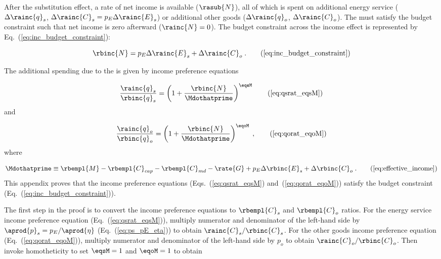

After the substitution effect, 
a rate of net income is available ($\rasub{N}$), 
all of which is spent on
additional energy service ($\Delta \rainc{q}_s$, $\Delta \rainc{C}_s = p_E \Delta \rainc{E}_s$) or 
additional other goods ($\Delta \rainc{q}_o$, $\Delta \rainc{C}_o$).
The \inceffect{} must satisfy the budget constraint
such that net income is zero afterward ($\rainc{N} = 0$).
The budget constraint across the income effect 
is represented by Eq.~(\ref{eq:inc_budget_constraint}): 

\begin{equation}
  \rbinc{N} = p_E \Delta \rainc{E}_s + \Delta \rainc{C}_o \; . \tag{\ref{eq:inc_budget_constraint}}
\end{equation}

The additional spending due to the \inceffect{} is given by income preference equations

\begin{equation}
  \frac{\rainc{q}_s}{\rbinc{q}_s} = \left( 1 + \frac{\rbinc{N}}{\Mdothatprime}  \right) ^{\eqsM} 
                                                                \tag{\ref{eq:qsrat_eqsM}}
\end{equation}
%
and

\begin{equation}
  \frac{\rainc{q}_o}{\rbinc{q}_o} = \left( 1 + \frac{\rbinc{N}}{\Mdothatprime}  \right) ^{\eqoM} \; ,
                                                                \tag{\ref{eq:qorat_eqoM}}
\end{equation}
%
where

\begin{equation}
  \Mdothatprime \equiv \rbempl{M} - \rbempl{C}_{cap} - \rbempl{C}_{md} 
                       - \rate{G} + p_E \Delta \rbinc{E}_s + \Delta \rbinc{C}_o \; .
                                                                \tag{\ref{eq:effective_income}}
\end{equation}
%
This appendix proves that the income preference equations 
(Eqs.~(\ref{eq:qsrat_eqsM}) and~(\ref{eq:qorat_eqoM}))
satisfy the budget constraint (Eq.~(\ref{eq:inc_budget_constraint})).

The first step in the proof is to convert 
the income preference equations
to $\rbempl{C}_s$ and $\rbempl{C}_o$ ratios.
For the energy service income preference equation (Eq.~(\ref{eq:qsrat_eqsM})), 
multiply numerator and denominator of the left-hand side by $\aprod{p}_s = p_E / \aprod{\eta}$
(Eq.~(\ref{eq:ps_pE_eta}))
to obtain $\rainc{C}_s / \rbinc{C}_s$.
For the other goods income preference equation (Eq.~(\ref{eq:qorat_eqoM})), 
multiply numerator and denominator of the left-hand side by $p_o$
to obtain $\rainc{C}_o / \rbinc{C}_o$.
Then invoke homotheticity to set $\eqsM = 1$ and $\eqoM = 1$ to obtain

